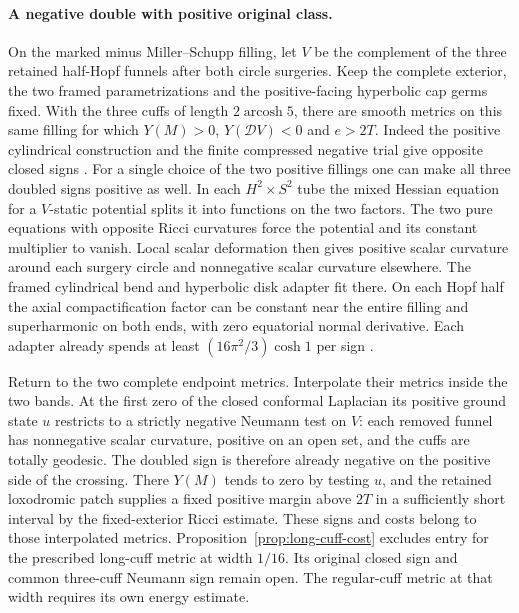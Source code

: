 \documentclass[11pt,letterpaper]{article}
\numberwithin{equation}{section}
\begin{document}
\paragraph{A negative double with positive original class.}
On the marked minus Miller--Schupp filling, let \(V\) be the complement
of the three retained half-Hopf funnels after both circle surgeries.
Keep the complete exterior, the two framed parametrizations and the
positive-facing hyperbolic cap germs fixed. With the three cuffs of
length \(2\operatorname{arcosh}5\), there are smooth metrics on this
same filling for which \(Y(M)>0\), \(Y(\mathcal D V)<0\) and
\(e>2T\). Indeed the positive cylindrical construction and the
finite compressed negative trial give opposite closed signs
\cite{Baker2026ThreeFunnelComparison}. For a single choice of the two
positive fillings one can make all three doubled signs positive as well.
In each \(H^2\times S^2\) tube the mixed Hessian equation for a
\(V\)-static potential splits it into functions on the two factors.
The two pure equations with opposite Ricci curvatures force the potential
and its constant multiplier to vanish. Local scalar deformation
\cite[Theorem 1.2]{CorvinoEichmairMiao2013Deformation} then gives positive
scalar curvature around each surgery circle and nonnegative scalar
curvature elsewhere. The framed cylindrical bend and hyperbolic disk
adapter fit there. On each Hopf half the axial compactification factor
can be constant near the entire filling and superharmonic on both ends,
with zero equatorial normal derivative. Each adapter already spends
at least \((16\pi^2/3)\cosh1\) per sign
\cite{Baker2026ThreeFunnelComparison}.

Return to the two complete endpoint metrics. Interpolate their metrics inside the two
bands. At the first zero of the closed conformal Laplacian its positive
ground state \(u\) restricts to a strictly negative Neumann test on
\(V\): each removed funnel has nonnegative scalar curvature, positive
on an open set, and the cuffs are totally geodesic. The doubled sign
is therefore already negative on the positive side of the crossing.
There \(Y(M)\) tends to zero by testing \(u\), and the retained
loxodromic patch supplies a fixed positive margin above \(2T\)
in a sufficiently short interval by the fixed-exterior Ricci estimate.
These signs and costs belong to those interpolated metrics.
Proposition~\ref{prop:long-cuff-cost} excludes entry for the prescribed
long-cuff metric at width \(1/16\). Its original closed sign and common
three-cuff Neumann sign remain open. The regular-cuff metric at that
width requires its own energy estimate.
\end{document}
